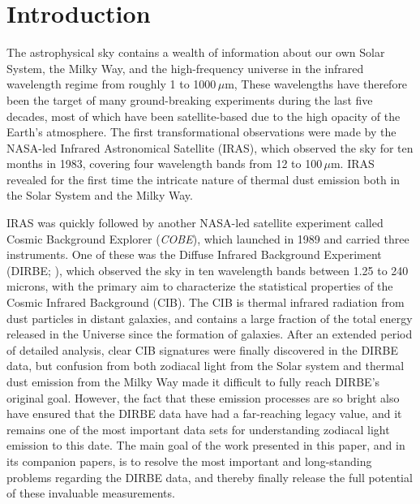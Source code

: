 \documentclass{aa}
\def\COBE{\textit{COBE}}
\begin{document}

   \maketitle

\setcounter{tocdepth}{2}
\tableofcontents
   
\section{Introduction}


The astrophysical sky contains a wealth of information about our own Solar System, the Milky Way, and the high-frequency universe in the infrared wavelength regime from roughly 1 to 1000\,$\mu$m, These wavelengths have therefore been the target of many ground-breaking experiments during the last five decades, most of which have been satellite-based due to the high opacity of the Earth's atmosphere. The first transformational observations were made by the NASA-led Infrared Astronomical Satellite (IRAS), which observed the sky for ten months in 1983, covering four wavelength bands from 12 to 100$\,\mu$m. IRAS revealed for the first time the intricate nature of thermal dust emission both in the Solar System and the Milky Way.

IRAS was quickly followed by another NASA-led satellite experiment called Cosmic Background Explorer (\COBE), which launched in 1989 and carried three instruments. One of these was the Diffuse Infrared Background Experiment (DIRBE; \citealp{hauser1998}), which observed the sky in ten wavelength bands between 1.25 to 240 microns, with the primary aim to characterize the statistical properties of the Cosmic Infrared Background (CIB). The CIB is thermal infrared radiation from dust particles in distant galaxies, and contains a large fraction of the total energy released in the Universe since the formation of galaxies. After an extended period of detailed analysis, clear CIB signatures were finally discovered in the DIRBE data, but confusion from both zodiacal light from the Solar system and thermal dust emission from the Milky Way made it difficult to fully reach DIRBE's original goal. However, the fact that these emission processes are so bright also have ensured that the DIRBE data have had a far-reaching legacy value, and it remains one of the most important data sets for understanding zodiacal light emission to this date. The main goal of the work presented in this paper, and in its companion papers, is to resolve the most important and long-standing problems regarding the DIRBE data, and thereby finally release the full potential of these invaluable measurements.
\end{document}
